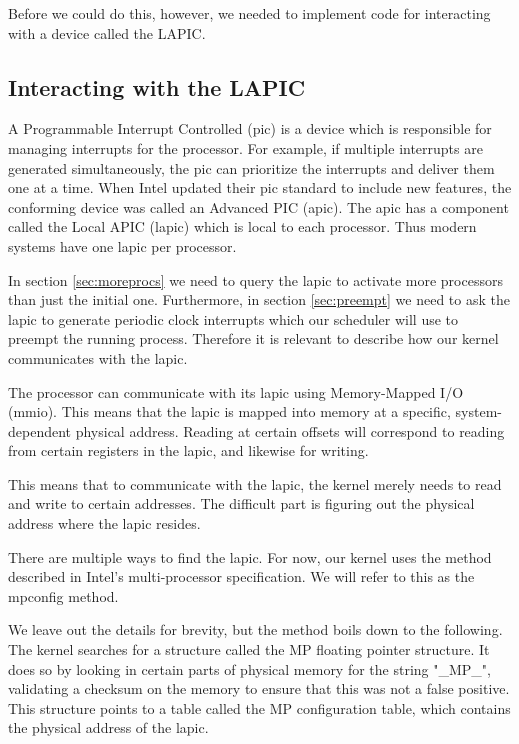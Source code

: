 \documentclass{article}
\begin{document}
Before we could do this, however, we needed to implement code for interacting
with a device called the LAPIC.


\subsection{Interacting with the LAPIC}
A Programmable Interrupt Controlled (\gls{pic}) is a device which is
responsible for managing interrupts for the processor. For example, if
multiple interrupts are generated simultaneously, the \gls{pic} can prioritize
the interrupts and deliver them one at a time. When Intel updated their
\gls{pic} standard to include new features, the conforming device was called
an Advanced PIC (\gls{apic}). The \gls{apic} has a component called the Local
APIC (\gls{lapic}) which is local to each processor. Thus modern systems have
one \gls{lapic} per processor.

In section \ref{sec:moreprocs} we need to query the \gls{lapic} to activate
more processors than just the initial one. Furthermore, in section
\ref{sec:preempt} we need to ask the \gls{lapic} to generate periodic clock
interrupts which our scheduler will use to preempt the running process.
Therefore it is relevant to describe how our kernel communicates with the
\gls{lapic}.

The processor can communicate with its \gls{lapic} using Memory-Mapped I/O
(\gls{mmio}). This means that the \gls{lapic} is mapped into memory at a
specific, system-dependent physical address. Reading at certain offsets will
correspond to reading from certain registers in the \gls{lapic}, and likewise
for writing.

This means that to communicate with the \gls{lapic}, the kernel merely needs
to read and write to certain addresses. The difficult part is figuring out the
physical address where the \gls{lapic} resides.

There are multiple ways to find the \gls{lapic}. For now, our kernel uses the
method described in Intel's multi-processor specification. We will refer to
this as the \gls{mpconfig} method.

We leave out the details for brevity, but the method boils down to the
following. The kernel searches for a structure called the MP floating pointer
structure. It does so by looking in certain parts of physical memory for the
string "\_MP\_", validating a checksum on the memory to ensure that this was
not a false positive. This structure points to a table called the MP
configuration table, which contains the physical address of the \gls{lapic}. 
\end{document}
